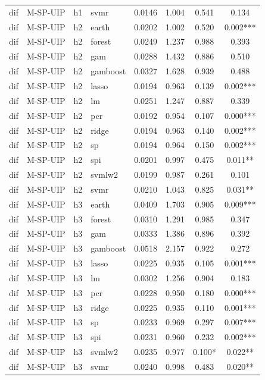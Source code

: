 \begin{ThreePartTable}
\begin{longtable}[t]{llclcccc}
dif & M-SP-UIP & h1 & svmr & 0.0146 & 1.004 & 0.541 & 0.134\\
\addlinespace
dif & M-SP-UIP & h2 & earth & 0.0202 & 1.002 & 0.520 & 0.002***\\
dif & M-SP-UIP & h2 & forest & 0.0249 & 1.237 & 0.988 & 0.393\\
dif & M-SP-UIP & h2 & gam & 0.0288 & 1.432 & 0.886 & 0.510\\
dif & M-SP-UIP & h2 & gamboost & 0.0327 & 1.628 & 0.939 & 0.488\\
dif & M-SP-UIP & h2 & lasso & 0.0194 & 0.963 & 0.139 & 0.002***\\
dif & M-SP-UIP & h2 & lm & 0.0251 & 1.247 & 0.887 & 0.339\\
dif & M-SP-UIP & h2 & pcr & 0.0192 & 0.954 & 0.107 & 0.000***\\
dif & M-SP-UIP & h2 & ridge & 0.0194 & 0.963 & 0.140 & 0.002***\\
dif & M-SP-UIP & h2 & sp & 0.0194 & 0.964 & 0.150 & 0.002***\\
dif & M-SP-UIP & h2 & spi & 0.0201 & 0.997 & 0.475 & 0.011**\\
dif & M-SP-UIP & h2 & svmlw2 & 0.0199 & 0.987 & 0.261 & 0.101\\
dif & M-SP-UIP & h2 & svmr & 0.0210 & 1.043 & 0.825 & 0.031**\\
\addlinespace
dif & M-SP-UIP & h3 & earth & 0.0409 & 1.703 & 0.905 & 0.009***\\
dif & M-SP-UIP & h3 & forest & 0.0310 & 1.291 & 0.985 & 0.347\\
dif & M-SP-UIP & h3 & gam & 0.0333 & 1.386 & 0.896 & 0.392\\
dif & M-SP-UIP & h3 & gamboost & 0.0518 & 2.157 & 0.922 & 0.272\\
dif & M-SP-UIP & h3 & lasso & 0.0225 & 0.935 & 0.105 & 0.001***\\
dif & M-SP-UIP & h3 & lm & 0.0302 & 1.256 & 0.904 & 0.183\\
dif & M-SP-UIP & h3 & pcr & 0.0228 & 0.950 & 0.180 & 0.000***\\
dif & M-SP-UIP & h3 & ridge & 0.0225 & 0.935 & 0.110 & 0.001***\\
dif & M-SP-UIP & h3 & sp & 0.0233 & 0.969 & 0.297 & 0.007***\\
dif & M-SP-UIP & h3 & spi & 0.0231 & 0.960 & 0.232 & 0.002***\\
dif & M-SP-UIP & h3 & svmlw2 & 0.0235 & 0.977 & 0.100* & 0.022**\\
dif & M-SP-UIP & h3 & svmr & 0.0240 & 0.998 & 0.483 & 0.020**\\

\end{longtable}
\end{ThreePartTable}
